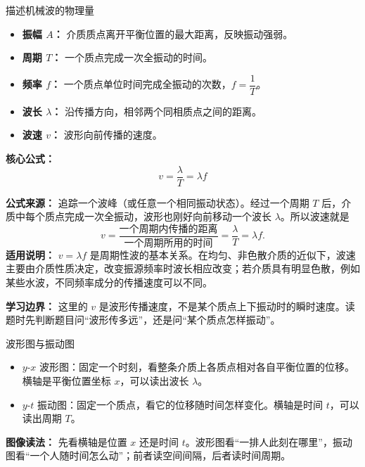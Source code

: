 \begin{conceptbox}{描述机械波的物理量}

\begin{center}


\label{fig:wave-parameters}
\end{center}

\begin{itemize}
  \item \textbf{振幅 $A$：} 介质质点离开平衡位置的最大距离，反映振动强弱。
  \item \textbf{周期 $T$：} 一个质点完成一次全振动的时间。
  \item \textbf{频率 $f$：} 一个质点单位时间完成全振动的次数，$f=\dfrac{1}{T}$。
  \item \textbf{波长 $\lambda$：} 沿传播方向，相邻两个同相质点之间的距离。
  \item \textbf{波速 $v$：} 波形向前传播的速度。
\end{itemize}

\textbf{核心公式：}
\[
\boxed{v=\frac{\lambda}{T}=\lambda f}
\]

\textbf{公式来源：} 追踪一个波峰（或任意一个相同振动状态）。经过一个周期 $T$ 后，介质中每个质点完成一次全振动，波形也刚好向前移动一个波长 $\lambda$。所以波速就是
\[
v=\frac{\text{一个周期内传播的距离}}{\text{一个周期所用的时间}}
 =\frac{\lambda}{T}=\lambda f.
\]
\textbf{适用说明：} $v=\lambda f$ 是周期性波的基本关系。在均匀、非色散介质的近似下，波速主要由介质性质决定，改变振源频率时波长相应改变；若介质具有明显色散，例如某些水波，不同频率成分的传播速度可以不同。

\textbf{学习边界：} 这里的 $v$ 是波形传播速度，不是某个质点上下振动时的瞬时速度。读题时先判断题目问“波形传多远”，还是问“某个质点怎样振动”。

\end{conceptbox}

\begin{conceptbox}{波形图与振动图}

\begin{center}


\label{fig:wave-yx-yt-compare}
\end{center}

\begin{itemize}
  \item $y$-$x$ 波形图：固定一个时刻，看整条介质上各质点相对各自平衡位置的位移。横轴是平衡位置坐标 $x$，可以读出波长 $\lambda$。
  \item $y$-$t$ 振动图：固定一个质点，看它的位移随时间怎样变化。横轴是时间 $t$，可以读出周期 $T$。
\end{itemize}

\textbf{图像读法：} 先看横轴是位置 $x$ 还是时间 $t$。波形图看“一排人此刻在哪里”，振动图看“一个人随时间怎么动”；前者读空间间隔，后者读时间周期。

\end{conceptbox}

